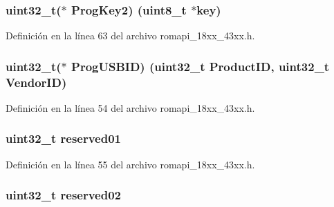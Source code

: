 \subsubsection[{\texorpdfstring{Prog\+Key2}{ProgKey2}}]{\setlength{\rightskip}{0pt plus 5cm}uint32\+\_\+t($\ast$ Prog\+Key2) (uint8\+\_\+t $\ast$key)}\hypertarget{struct_o_t_p___a_p_i___t_a043dc436fadf729d52f2db6570d9e8af}{}\label{struct_o_t_p___a_p_i___t_a043dc436fadf729d52f2db6570d9e8af}


Definición en la línea 63 del archivo romapi\+\_\+18xx\+\_\+43xx.\+h.

\subsubsection[{\texorpdfstring{Prog\+U\+S\+B\+ID}{ProgUSBID}}]{\setlength{\rightskip}{0pt plus 5cm}uint32\+\_\+t($\ast$ Prog\+U\+S\+B\+ID) (uint32\+\_\+t Product\+ID, uint32\+\_\+t Vendor\+ID)}\hypertarget{struct_o_t_p___a_p_i___t_ae9d656828234e101564e718306fe7292}{}\label{struct_o_t_p___a_p_i___t_ae9d656828234e101564e718306fe7292}


Definición en la línea 54 del archivo romapi\+\_\+18xx\+\_\+43xx.\+h.

\subsubsection[{\texorpdfstring{reserved01}{reserved01}}]{\setlength{\rightskip}{0pt plus 5cm}uint32\+\_\+t reserved01}\hypertarget{struct_o_t_p___a_p_i___t_a8d5004536bec0ff0e679112ce554af6c}{}\label{struct_o_t_p___a_p_i___t_a8d5004536bec0ff0e679112ce554af6c}


Definición en la línea 55 del archivo romapi\+\_\+18xx\+\_\+43xx.\+h.

\subsubsection[{\texorpdfstring{reserved02}{reserved02}}]{\setlength{\rightskip}{0pt plus 5cm}uint32\+\_\+t reserved02}\hypertarget{struct_o_t_p___a_p_i___t_a5092df8b6837fdfef7763c16671c7950}{}\label{struct_o_t_p___a_p_i___t_a5092df8b6837fdfef7763c16671c7950}


